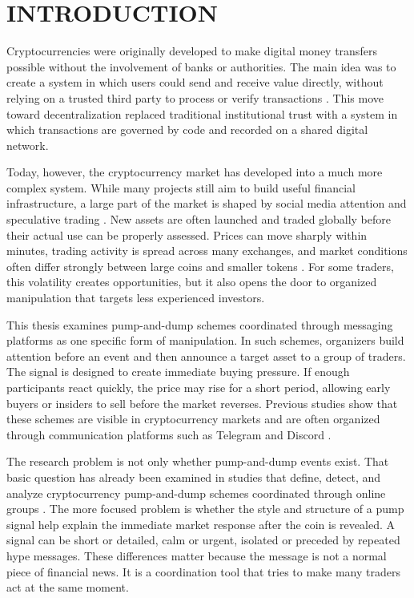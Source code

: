 \chapter*{INTRODUCTION}

Cryptocurrencies were originally developed to make digital money transfers possible without the involvement of banks or authorities. The main idea was to create a system in which users could send and receive value directly, without relying on a trusted third party to process or verify transactions \cite{nakamoto2008bitcoin}. This move toward decentralization replaced traditional institutional trust with a system in which transactions are governed by code and recorded on a shared digital network.

Today, however, the cryptocurrency market has developed into a much more complex system. While many projects still aim to build useful financial infrastructure, a large part of the market is shaped by social media attention and speculative trading \cite{mirtaheri2021identifying, hamrick2021examination, lamorgia2023doge}. New assets are often launched and traded globally before their actual use can be properly assessed. Prices can move sharply within minutes, trading activity is spread across many exchanges, and market conditions often differ strongly between large coins and smaller tokens \cite{makarov2020trading, liu2021risks}. For some traders, this volatility creates opportunities, but it also opens the door to organized manipulation that targets less experienced investors.

This thesis examines pump-and-dump schemes coordinated through messaging platforms as one specific form of manipulation. In such schemes, organizers build attention before an event and then announce a target asset to a group of traders. The signal is designed to create immediate buying pressure. If enough participants react quickly, the price may rise for a short period, allowing early buyers or insiders to sell before the market reverses. Previous studies show that these schemes are visible in cryptocurrency markets and are often organized through communication platforms such as Telegram and Discord \cite{kamps2018pump, xu2019anatomy, hamrick2021examination, li2021cryptocurrency, lamorgia2023doge}.

The research problem is not only whether pump-and-dump events exist. That basic question has already been examined in studies that define, detect, and analyze cryptocurrency pump-and-dump schemes coordinated through online groups \cite{kamps2018pump, xu2019anatomy, hamrick2021examination, li2021cryptocurrency}. The more focused problem is whether the style and structure of a pump signal help explain the immediate market response after the coin is revealed. A signal can be short or detailed, calm or urgent, isolated or preceded by repeated hype messages. These differences matter because the message is not a normal piece of financial news. It is a coordination tool that tries to make many traders act at the same moment.

